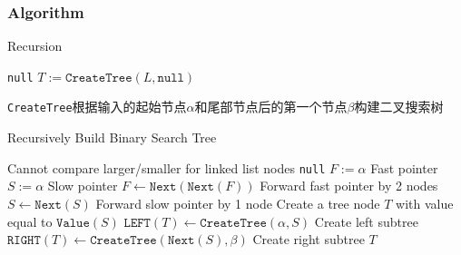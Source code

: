 \subsubsection{Algorithm}
\setcounter{algorithm}{0}
\begin{algorithm}[H]
\caption{Recursion}
\begin{algorithmic}[1]
\State \Return \texttt{null}
\EndIf
\State $T:=\texttt{CreateTree}(L, \texttt{null})$
\EndProcedure
\end{algorithmic}
\end{algorithm}
 \begin{CJK*}{UTF8}{gbsn}
 \texttt{CreateTree}根据输入的起始节点$\alpha$和尾部节点后的第一个节点$\beta$构建二叉搜索树
\end{CJK*}
\begin{algorithm}[H]
\caption{Recursively Build Binary Search Tree}
\begin{algorithmic}[1]
\If{$\alpha=\beta$} \Comment Cannot compare larger/smaller for linked list nodes
\State \Return \texttt{null}
\EndIf
\State $F:=\alpha$ \Comment Fast pointer
\State $S:=\alpha$ \Comment Slow pointer
\State $F\gets \texttt{Next}(\texttt{Next}(F))$ \Comment Forward fast pointer by 2 nodes
\State $S\gets \texttt{Next}(S)$ \Comment Forward slow pointer by 1 node
\EndWhile
\State Create a tree node $T$ with value equal to $\texttt{Value}(S)$ 
\State $\texttt{LEFT}(T)\gets \texttt{CreateTree}(\alpha, S)$ \Comment Create left subtree
\State $\texttt{RIGHT}(T)\gets \texttt{CreateTree}(\texttt{Next}(S), \beta)$ \Comment Create right subtree
\State \Return $T$
\EndFunction
\end{algorithmic}
\end{algorithm} 